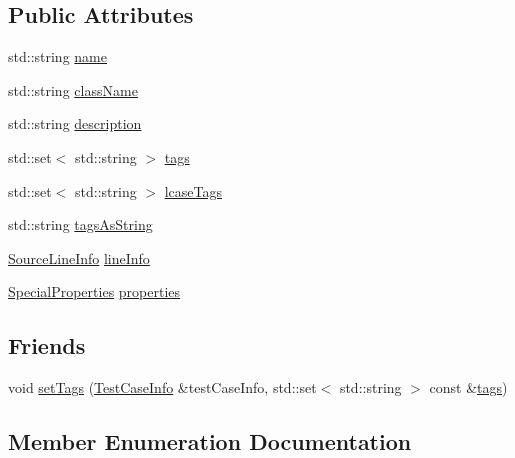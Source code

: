 \subsection*{Public Attributes}
\begin{DoxyCompactItemize}
\item 
std\+::string \hyperlink{struct_catch_1_1_test_case_info_a463794e2f5cfead307c93efd134ade36}{name}
\item 
std\+::string \hyperlink{struct_catch_1_1_test_case_info_a1a5e0825132a38d091defdebbf2f8ce9}{class\+Name}
\item 
std\+::string \hyperlink{struct_catch_1_1_test_case_info_a37fe2db9425bc45f6a33893eac31198e}{description}
\item 
std\+::set$<$ std\+::string $>$ \hyperlink{struct_catch_1_1_test_case_info_a045f62e7719a8760a5b456f7fd2dc97c}{tags}
\item 
std\+::set$<$ std\+::string $>$ \hyperlink{struct_catch_1_1_test_case_info_a0ed3864a313e8ddc3ae38431be5be9ae}{lcase\+Tags}
\item 
std\+::string \hyperlink{struct_catch_1_1_test_case_info_ac65c2d36fd36f71e9bf782b2ea245c64}{tags\+As\+String}
\item 
\hyperlink{struct_catch_1_1_source_line_info}{Source\+Line\+Info} \hyperlink{struct_catch_1_1_test_case_info_aa9407b7f442655b51a2aad24b3fa2fd3}{line\+Info}
\item 
\hyperlink{struct_catch_1_1_test_case_info_a39b232f74b4a7a6f2183b96759027eac}{Special\+Properties} \hyperlink{struct_catch_1_1_test_case_info_afc1e84bd7a2e180895a06d9131302af0}{properties}
\end{DoxyCompactItemize}
\subsection*{Friends}
\begin{DoxyCompactItemize}
\item 
void \hyperlink{struct_catch_1_1_test_case_info_addc10c770e56f49da5baa0c76cf25bd5}{set\+Tags} (\hyperlink{struct_catch_1_1_test_case_info}{Test\+Case\+Info} \&test\+Case\+Info, std\+::set$<$ std\+::string $>$ const \&\hyperlink{struct_catch_1_1_test_case_info_a045f62e7719a8760a5b456f7fd2dc97c}{tags})
\end{DoxyCompactItemize}


\subsection{Member Enumeration Documentation}
\hypertarget{struct_catch_1_1_test_case_info_a39b232f74b4a7a6f2183b96759027eac}{}\label{struct_catch_1_1_test_case_info_a39b232f74b4a7a6f2183b96759027eac} 
